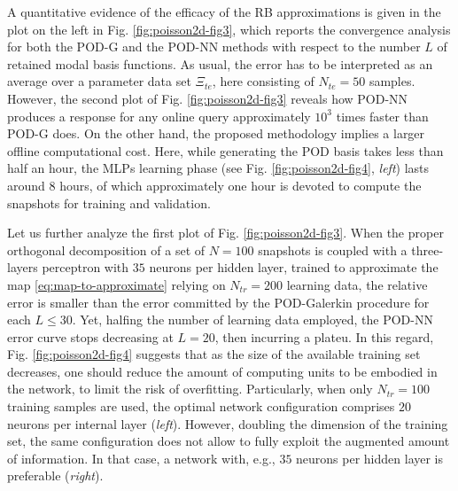 \documentclass[longtitle]{elsarticle}
\numberwithin{equation}{section}
\theoremstyle{theorem}
\theoremstyle{definition}
\theoremstyle{remark}
\theoremstyle{proposition}
\numberwithin{figure}{section}
\begin{document}
		
		A quantitative evidence of the efficacy of the RB approximations is given in the plot on the left in Fig. \ref{fig:poisson2d-fig3}, which reports the convergence analysis for both the POD-G and the POD-NN methods with respect to the number $L$ of retained modal basis functions. As usual, the error has to be interpreted as an average over a parameter data set $\Xi_{te}$, here consisting of $N_{te} = 50$ samples. However, the second plot of Fig. \ref{fig:poisson2d-fig3} reveals how POD-NN produces a response for any online query approximately $10^3$ times faster than POD-G does. On the other hand, the proposed methodology implies a larger offline computational cost. Here, while generating the POD basis takes less than half an hour, the MLPs learning phase (see Fig. \ref{fig:poisson2d-fig4}, \emph{left}) lasts around $8$ hours, of which approximately one hour is devoted to compute the snapshots for training and validation. 

		Let us further analyze the first plot of Fig. \ref{fig:poisson2d-fig3}. When the proper orthogonal decomposition of a set of $N = 100$ snapshots is coupled with a three-layers perceptron with $35$ neurons per hidden layer, trained to approximate the map \eqref{eq:map-to-approximate} relying on $N_{tr} = 200$ learning data, the relative error is smaller than the error committed by the POD-Galerkin procedure for each $L \leq 30$. Yet, halfing the number of learning data employed, the POD-NN error curve stops decreasing at $L = 20$, then incurring a plateu. In this regard, Fig. \ref{fig:poisson2d-fig4} suggests that as the size of the available training set decreases, one should reduce the amount of computing units to be embodied in the network, to limit the risk of overfitting. Particularly, when only $N_{tr} = 100$ training samples are used, the optimal network configuration comprises $20$ neurons per internal layer (\emph{left}). However, doubling the dimension of the training set, the same configuration does not allow to fully exploit the augmented amount of information. In that case, a network with, e.g., $35$ neurons per hidden layer is preferable (\emph{right}). 
	
\end{document}
